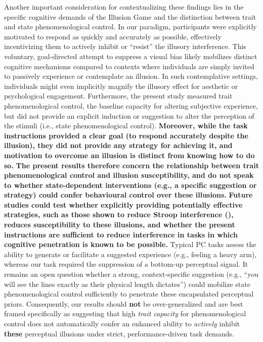 \documentclass[
  man,
  floatsintext,
  longtable,
  nolmodern,
  notxfonts,
  notimes,
  colorlinks=true,linkcolor=blue,citecolor=blue,urlcolor=blue]{apa7}
\begin{document}
Another important consideration for contextualizing these findings lies
in the specific cognitive demands of the Illusion Game and the
distinction between trait and state phenomenological control. In our
paradigm, participants were explicitly motivated to respond as quickly
and accurately as possible, effectively incentivizing them to actively
inhibit or ``resist'' the illusory interference. This voluntary,
goal-directed attempt to suppress a visual bias likely mobilizes
distinct cognitive mechanisms compared to contexts where individuals are
simply invited to passively experience or contemplate an illusion. In
such contemplative settings, individuals might even implicitly magnify
the illusory effect for aesthetic or psychological engagement.
Furthermore, the present study measured trait phenomenological control,
the baseline capacity for altering subjective experience, but did not
provide an explicit induction or suggestion to alter the perception of
the stimuli (i.e., state phenomenological control). \textbf{Moreover,
while the task instructions provided a clear goal (to respond accurately
despite the illusion), they did not provide any strategy for achieving
it, and motivation to overcome an illusion is distinct from knowing how
to do so.} \textbf{The present results therefore concern the
relationship between trait phenomenological control and illusion
susceptibility, and do not speak to whether state-dependent
interventions (e.g., a specific suggestion or strategy) could confer
behavioural control over these illusions.} \textbf{Future studies could
test whether explicitly providing potentially effective strategies, such
as those shown to reduce Stroop interference
(), reduces susceptibility
to these illusions, and whether the present instructions are sufficient
to reduce interference in tasks in which cognitive penetration is known
to be possible.} Typical PC tasks assess the ability to generate or
facilitate a suggested experience (e.g., feeling a heavy arm), whereas
our task required the suppression of a bottom-up perceptual signal. It
remains an open question whether a strong, context-specific suggestion
(e.g., ``you will see the lines exactly as their physical length
dictates'') could mobilize state phenomenological control sufficiently
to penetrate these encapsulated perceptual priors. Consequently, our
results should \textbf{not} be over-generalized and are best framed
specifically as suggesting that high \emph{trait capacity} for
phenomenological control does not automatically confer an enhanced
ability to \emph{actively} inhibit \textbf{these} perceptual illusions
under strict, performance-driven task demands.
\end{document}
